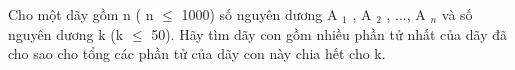 Cho một dãy gồm n ( n  $\le$  1000) số nguyên dương A   $_    1   $   , A   $_    2   $   , ..., A   $_    n   $   và số nguyên dương k (k  $\le$  50). Hãy tìm dãy con gồm nhiều phần tử nhất của dãy đã cho sao cho tổng các phần tử của dãy con này chia hết cho k.  

\